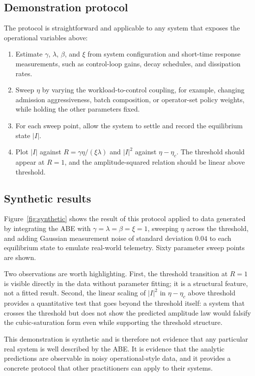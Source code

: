 \documentclass[11pt]{article}
\begin{document}
\subsection{Demonstration protocol}
The protocol is straightforward and applicable to any system that exposes the operational variables above:
\begin{enumerate}
  \item Estimate $\gamma$, $\lambda$, $\beta$, and $\xi$ from system configuration and short-time response measurements, such as control-loop gains, decay schedules, and dissipation rates.
  \item Sweep $\eta$ by varying the workload-to-control coupling, for example, changing admission aggressiveness, batch composition, or operator-set policy weights, while holding the other parameters fixed.
  \item For each sweep point, allow the system to settle and record the equilibrium state $|I|$.
  \item Plot $|I|$ against $R=\gamma\eta/(\xi\lambda)$ and $|I|^2$ against $\eta-\eta_c$. The threshold should appear at $R=1$, and the amplitude-squared relation should be linear above threshold.
\end{enumerate}

\subsection{Synthetic results}
Figure~\ref{fig:synthetic} shows the result of this protocol applied to data generated by integrating the ABE with $\gamma=\lambda=\beta=\xi=1$, sweeping $\eta$ across the threshold, and adding Gaussian measurement noise of standard deviation $0.04$ to each equilibrium state to emulate real-world telemetry. Sixty parameter sweep points are shown.

Two observations are worth highlighting. First, the threshold transition at $R=1$ is visible directly in the data without parameter fitting; it is a structural feature, not a fitted result. Second, the linear scaling of $|I|^2$ in $\eta-\eta_c$ above threshold provides a quantitative test that goes beyond the threshold itself: a system that crosses the threshold but does not show the predicted amplitude law would falsify the cubic-saturation form even while supporting the threshold structure.

This demonstration is synthetic and is therefore not evidence that any particular real system is well described by the ABE. It is evidence that the analytic predictions are observable in noisy operational-style data, and it provides a concrete protocol that other practitioners can apply to their systems.
\end{document}
